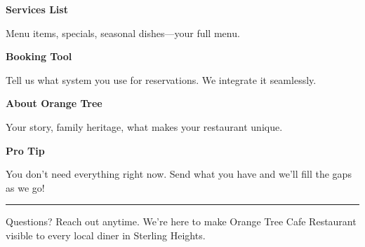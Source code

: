 \documentclass[11pt,letterpaper]{article}
\begin{document}
\hfill
\begin{minipage}[t]{0.48\textwidth}
\begin{tcolorbox}[colframe=accent-teal, boxrule=1pt, left=0.7em, right=0.7em, top=0.5em, bottom=0.5em, arc=4pt, boxsep=0pt]
{\bfseries\small\color{accent-teal}Services List}

\vspace{0.15em}

{\small Menu items, specials, seasonal dishes—your full menu.}
\end{tcolorbox}

\vspace{0.1em}

\begin{tcolorbox}[colframe=accent-teal, boxrule=1pt, left=0.7em, right=0.7em, top=0.5em, bottom=0.5em, arc=4pt, boxsep=0pt]
{\bfseries\small\color{accent-teal}Booking Tool}

\vspace{0.15em}

{\small Tell us what system you use for reservations. We integrate it seamlessly.}
\end{tcolorbox}

\vspace{0.1em}

\begin{tcolorbox}[colframe=accent-teal, boxrule=1pt, left=0.7em, right=0.7em, top=0.5em, bottom=0.5em, arc=4pt, boxsep=0pt]
{\bfseries\small\color{accent-teal}About Orange Tree}

\vspace{0.15em}

{\small Your story, family heritage, what makes your restaurant unique.}
\end{tcolorbox}

\vspace{-0.2em}
\end{minipage}

\vspace{0.15em}

\begin{tcolorbox}[colback={accent-red!5}, colframe=accent-red!20, boxrule=0.5pt, left=0.7em, right=0.7em, top=0.4em, bottom=0.4em, arc=6pt, boxsep=0pt]

{\bfseries\small\color{accent-red}Pro Tip}

\vspace{0.1em}

{\small You don't need everything right now. Send what you have and we'll fill the gaps as we go!}

\end{tcolorbox}

\vspace{0.15em}

\noindent\hrule
\vspace{0.2em}

{\small\color{text-light}Questions? Reach out anytime. We're here to make Orange Tree Cafe Restaurant visible to every local diner in Sterling Heights.}
\end{document}
